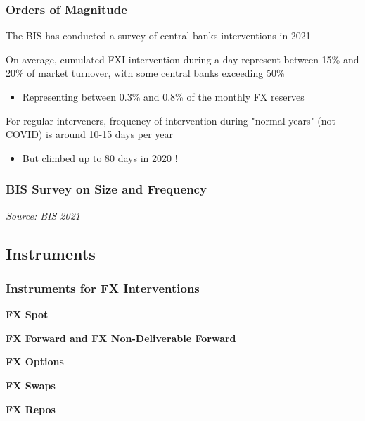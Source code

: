 \documentclass{beamer}
\newenvironment{wideitemize}{\itemize\addtolength{\itemsep}{10pt}}{\enditemize}
\begin{document}
\begin{frame}
  \frametitle{Orders of Magnitude}
  \begin{wideitemize}
  \item The BIS has conducted a survey of central banks interventions in 2021 \href{https://www.bis.org/publ/mc_insights_fxinterventions.pdf}{}
  \item On average, cumulated FXI intervention during a day represent between 15\% and 20\% of market turnover, with some central banks exceeding 50\%
    \begin{itemize}
    \item Representing between 0.3\% and 0.8\% of the monthly FX reserves
    \end{itemize}
  \item For regular interveners, frequency of intervention during "normal years" (not COVID) is around 10-15 days per year
    \begin{itemize}
    \item But climbed up to 80 days in 2020 !
    \end{itemize}
  \end{wideitemize}
\end{frame}

\begin{frame}
  \frametitle{BIS Survey on Size and Frequency}
  \medskip
  \emph{Source: BIS 2021 \href{https://www.bis.org/publ/mc_insights_fxinterventions.pdf}{}}
\end{frame}



\subsection{Instruments}
\begin{frame}
  \frametitle{Instruments for FX Interventions}
  \begin{wideitemize}
    \item \textbf{FX Spot}
    \item \textbf{FX Forward and FX Non-Deliverable Forward}
    \item \textbf{FX Options} 
    \item \textbf{FX Swaps} 
    \item \textbf{FX Repos}
  \end{wideitemize}
\end{frame}
\end{document}
